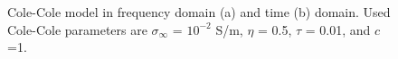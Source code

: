 \documentclass[extra,mreferee]{gji}
\newcommand{\siginf}{\sigma_\infty}
\begin{document}
\begin{figure}
  \caption{Cole-Cole model in frequency domain (a) and time (b) domain. Used Cole-Cole parameters are $\siginf$ = $10^{-2}$ S/m, $\eta $ = 0.5, $\tau$ = 0.01, and $c$=1.}
  \label{Fig:FDandTDCole}
\end{figure}

\end{document}
